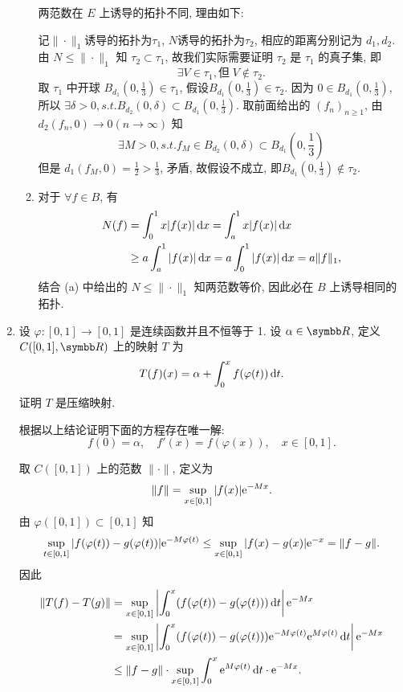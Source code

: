 \begin{enumerate}
\begin{answer}
\begin{enumerate}
        两范数在 $E$ 上诱导的拓扑不同, 理由如下:
        
        记$\|\cdot\|_1$诱导的拓扑为$\tau_1$, $N$诱导的拓扑为$\tau_2$, 
        相应的距离分别记为 $d_1,d_2$. 
        由 $N\leq \|\cdot\|_1$ 知 $\tau_2\subset\tau_1$, 
        故我们实际需要证明 $\tau_2$ 是 $\tau_1$ 的真子集, 即
        \[\exists V\in\tau_1,\text{但}\;V\notin\tau_2.\]
        取 $\tau_1$ 中开球 $B_{d_1}(0, \frac{1}{3})\in\tau_1$,
        假设$B_{d_1}(0, \frac{1}{3})\in\tau_2$. 因为 $0\in B_{d_1}(0, \frac{1}{3})$, 
        所以 $\exists\delta>0,s.t.B_{d_2}(0,\delta)\subset B_{d_1}(0, \frac{1}{3})$.
        取前面给出的 $(f_n)_{n\geq 1}$, 由$d_2(f_n,0)\to 0(n\to\infty)$ 知
        \[\exists M>0,s.t.f_M\in B_{d_2}(0,\delta)\subset B_{d_1}(0, \frac{1}{3})\]
        但是 $d_1(f_M,0)= \frac{1}{2}> \frac{1}{3}$, 矛盾, 故假设不成立, 即$B_{d_1}(0, \frac{1}{3})\notin\tau_2$.
        
        \item 对于 $\forall f\in B$, 有 
        \begin{align*}
            N(f) & =\int_0^1x|f(x)|\mathop{}\!\mathrm{d} x=\int_a^1 x|f(x)|\mathop{}\!\mathrm{d} x \\
                 & \geq a\int_a^1|f(x)|\mathop{}\!\mathrm{d} x=a\int_0^1|f(x)|\mathop{}\!\mathrm{d} x=a\|f\|_1,
        \end{align*} 
        结合 (a) 中给出的 $N\leq\|\cdot\|_1$ 知两范数等价, 因此必在 $B$ 上诱导相同的拓扑.
      \end{enumerate}
    \end{answer}
  \item 设 $\varphi:[0,1]\to[0,1]$ 是连续函数并且不恒等于 1. 设 $\alpha\in\R $, 定义 $C([0,1],\R )$ 上的映射 $T$ 为
  \[T(f)(x)=\alpha+\int_0^xf(\varphi(t))\mathop{}\!\mathrm{d} t.\]
  证明 $T$ 是压缩映射.

  根据以上结论证明下面的方程存在唯一解:
  \[f(0)=\alpha,\quad f'(x)=f(\varphi(x)),\quad x\in[0,1].\]
    \begin{answer}
      取 $C([0,1])$ 上的范数 $\|\cdot\|$, 定义为
      \[\|f\|=\sup\limits_{x\in [0,1]}|f(x)|\mathrm{e}^{-Mx}.\]
      由 $\varphi([0,1])\subset [0,1]$ 知
      \[\sup\limits_{t\in[0,1]}|f(\varphi(t))-g(\varphi(t))|\mathrm{e}^{-M\varphi(t)}\leq\sup\limits_{x\in[0,1]}|f(x)-g(x)|\mathrm{e}^{-x}=\|f-g\|.\]
      因此
      \begin{align*}
          \|T(f)-T(g)\| & =\sup\limits_{x\in[0,1]}\left|\int_0^x(f(\varphi(t))-g(\varphi(t)))\mathop{}\!\mathrm{d} t\right|\mathrm{e}^{-Mx}\\
                        & =\sup\limits_{x\in [0,1]}\left|\int_0^x(f(\varphi(t))-g(\varphi(t)))\mathrm{e}^{-M\varphi(t)}\mathrm{e}^{M\varphi(t)}\mathop{}\!\mathrm{d} t\right|\mathrm{e}^{-Mx}\\
                        & \leq\|f-g\|\cdot\sup\limits_{x\in [0,1]}\int_0^x\mathrm{e}^{M\varphi(t)}\mathop{}\!\mathrm{d} t\cdot\mathrm{e}^{-Mx}.
      \end{align*}


\end{answer}
\end{enumerate}
